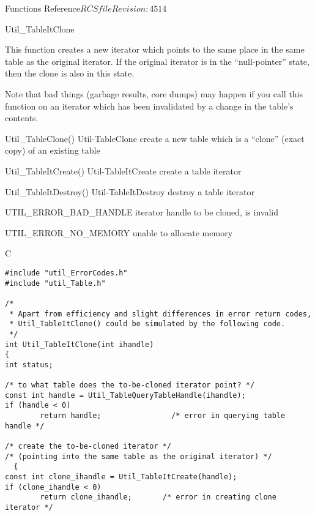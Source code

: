 \begin{cactuspart}{ Functions Reference}{$RCSfile$}{$Revision: 4514 $}
\begin{FunctionDescription}{Util\_TableItClone}
\begin{Discussion}
This function creates a new iterator which points to the same place
in the same table as the original iterator.  If the original iterator
is in the ``null-pointer'' state, then the clone is also in this state.

Note that bad things (garbage results, core dumps) may happen if
you call this function on an iterator which has been invalidated
by a change in the table's contents.
\end{Discussion}

\begin{SeeAlsoSection}
\begin{SeeAlso2} {Util\_TableClone()} {Util-TableClone}
create a new table which is a ``clone'' (exact copy) of an existing
table
\end{SeeAlso2}
\begin{SeeAlso2} {Util\_TableItCreate()} {Util-TableItCreate}
create a table iterator
\end{SeeAlso2}
\begin{SeeAlso2} {Util\_TableItDestroy()} {Util-TableItDestroy}
destroy a table iterator
\end{SeeAlso2}
\end{SeeAlsoSection}

\begin{ErrorSection}
\begin{Error}{UTIL\_ERROR\_BAD\_HANDLE}
iterator handle to be cloned, is invalid
\end{Error}
\begin{Error}{UTIL\_ERROR\_NO\_MEMORY}
unable to allocate memory
\end{Error}
\end{ErrorSection}

\begin{ExampleSection}
\begin{Example}{C}
\begin{verbatim}
#include "util_ErrorCodes.h"
#include "util_Table.h"

/*
 * Apart from efficiency and slight differences in error return codes,
 * Util_TableItClone() could be simulated by the following code.
 */
int Util_TableItClone(int ihandle)
{
int status;

/* to what table does the to-be-cloned iterator point? */
const int handle = Util_TableQueryTableHandle(ihandle);
if (handle < 0)
        return handle;                /* error in querying table handle */

/* create the to-be-cloned iterator */
/* (pointing into the same table as the original iterator) */
  {
const int clone_ihandle = Util_TableItCreate(handle);
if (clone_ihandle < 0)
        return clone_ihandle;       /* error in creating clone iterator */


\end{verbatim}
\end{Example}
\end{ExampleSection}
\end{FunctionDescription}
\end{cactuspart}
